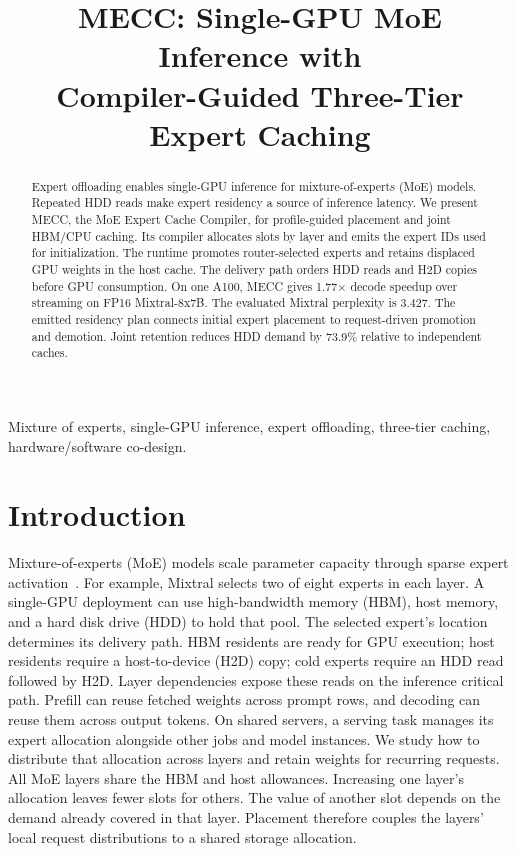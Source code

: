 \documentclass[conference,9pt,letterpaper]{IEEEtran}
\title{MECC: Single-GPU MoE Inference with\protect\\Compiler-Guided Three-Tier Expert Caching}
\author{}
\begin{document}
\maketitle\flushbottom
\begin{abstract}
Expert offloading enables single-GPU inference for mixture-of-experts (MoE) models. Repeated HDD reads make expert residency a source of inference latency. We present MECC, the MoE Expert Cache Compiler, for profile-guided placement and joint HBM/CPU caching. Its compiler allocates slots by layer and emits the expert IDs used for initialization. The runtime promotes router-selected experts and retains displaced GPU weights in the host cache. The delivery path orders HDD reads and H2D copies before GPU consumption. On one A100, MECC gives 1.77$\times$ decode speedup over streaming on FP16 Mixtral-8x7B. The evaluated Mixtral perplexity is 3.427. The emitted residency plan connects initial expert placement to request-driven promotion and demotion. Joint retention reduces HDD demand by 73.9\% relative to independent caches.
\end{abstract}

\begin{IEEEkeywords}
Mixture of experts, single-GPU inference, expert offloading, three-tier caching, hardware/software co-design.
\end{IEEEkeywords}

\section{Introduction}
Mixture-of-experts (MoE) models scale parameter capacity through sparse expert activation~\cite{shazeer,switch,mixtral,deepseekmoe}. For example, Mixtral selects two of eight experts in each layer. A single-GPU deployment can use high-bandwidth memory (HBM), host memory, and a hard disk drive (HDD) to hold that pool. The selected expert's location determines its delivery path. HBM residents are ready for GPU execution; host residents require a host-to-device (H2D) copy; cold experts require an HDD read followed by H2D. Layer dependencies expose these reads on the inference critical path. Prefill can reuse fetched weights across prompt rows, and decoding can reuse them across output tokens. On shared servers, a serving task manages its expert allocation alongside other jobs and model instances. We study how to distribute that allocation across layers and retain weights for recurring requests. All MoE layers share the HBM and host allowances. Increasing one layer's allocation leaves fewer slots for others. The value of another slot depends on the demand already covered in that layer. Placement therefore couples the layers' local request distributions to a shared storage allocation.
\end{document}
